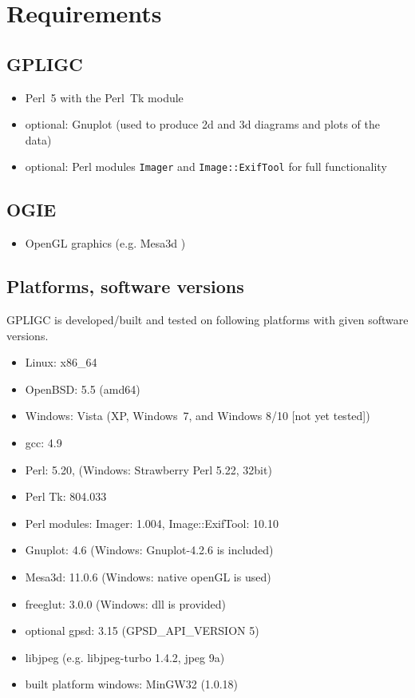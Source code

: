 \section{Requirements}
\label{requirements}

\subsection*{GPLIGC}

\begin{itemize}
\item Perl~5 with the Perl~Tk module \cite{perl,perltk}
\item {\scriptsize optional:} Gnuplot \cite{gnuplot} (used to produce 2d and 3d diagrams and plots of the data)
\item {\scriptsize optional:} Perl modules \texttt{Imager} \cite{imager} and \texttt{Image::ExifTool} \cite{exiftool} for full functionality
\end{itemize}


\subsection*{OGIE}

\begin{itemize}
\item OpenGL graphics (e.g. Mesa3d \cite{mesa})
\end{itemize}


\subsection*{Platforms, software versions}
GPLIGC is developed/built and tested on following platforms with given software versions.

\begin{itemize}
\item Linux: x86\_64
\item OpenBSD: 5.5 (amd64)
\item Windows: Vista (XP, Windows~7, and Windows 8/10 [not yet tested])
\item gcc: 4.9 %
\item Perl: 5.20, %
(Windows: Strawberry Perl 5.22, 32bit)
\item Perl Tk: 804.033
\item Perl modules: Imager: 1.004, %
Image::ExifTool: 10.10
\item Gnuplot: 4.6 (Windows: Gnuplot-4.2.6 is included)
\item Mesa3d: 11.0.6 (Windows: native openGL is used)
\item freeglut: 3.0.0 (Windows: dll is provided)
\item {\scriptsize optional} gpsd: 3.15 (GPSD\_API\_VERSION 5)
\item libjpeg (e.g. libjpeg-turbo 1.4.2, jpeg 9a)
\item built platform windows: MinGW32 (1.0.18)
\end{itemize}



